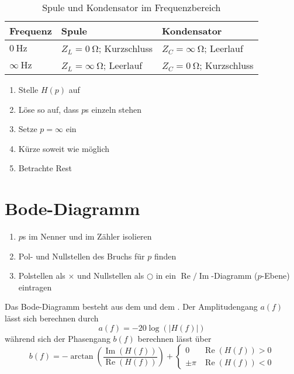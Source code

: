 \documentclass[12pt, a4paper, twoside]{scrartcl}
\begin{document}
\begin{table}[H]
  \centering
  \begin{tabular}{lll}
    \toprule
    Frequenz & Spule & Kondensator\\
    \midrule
    \(\SI{0}{\hertz}\) & \(Z_L = \SI{0}{\ohm}\); Kurzschluss & \(Z_C = \infty\ \si{\ohm}\); Leerlauf\\
    \(\infty\ \si{\hertz}\) & \(Z_L = \infty\ \si{\ohm}\); Leerlauf & \(Z_C = \SI{0}{\ohm}\); Kurzschluss\\
    \bottomrule
  \end{tabular}
  \caption{Spule und Kondensator im Frequenzbereich}
\end{table}


\begin{samepage}
  \nopagebreak
  \begin{enumerate}
  \item Stelle \(H(p)\) auf
  \item Löse so auf, dass \(p\)s einzeln stehen
  \item Setze \(p = \infty\) ein
  \item Kürze soweit wie möglich
  \item Betrachte Rest
  \end{enumerate}
\end{samepage}



\section{Bode-Diagramm}


\begin{enumerate}
\item \(p\)s im Nenner und im Zähler isolieren
\item Pol- und Nullstellen des Bruchs für \(p\) finden
\item Polstellen als \(\times\) und Nullstellen als \(\bigcirc\) in ein \(\operatorname{Re} / \operatorname{Im}\)-Diagramm (\(p\)-Ebene) eintragen
\end{enumerate}

Das Bode-Diagramm besteht aus dem  und dem . Der Amplitudengang \(a(f)\) lässt sich berechnen durch
\[a(f) = -20\log(|H(f)|)\]
während sich der Phasengang \(b(f)\) berechnen lässt über
\[b(f) = -\arctan\left(\frac{\operatorname{Im}(H(f))}{\operatorname{Re}(H(f))}\right) +
  \begin{cases}
    0 & \operatorname{Re}(H(f)) > 0\\
    \pm \pi & \operatorname{Re}(H(f)) < 0
  \end{cases}
\]
\end{document}
